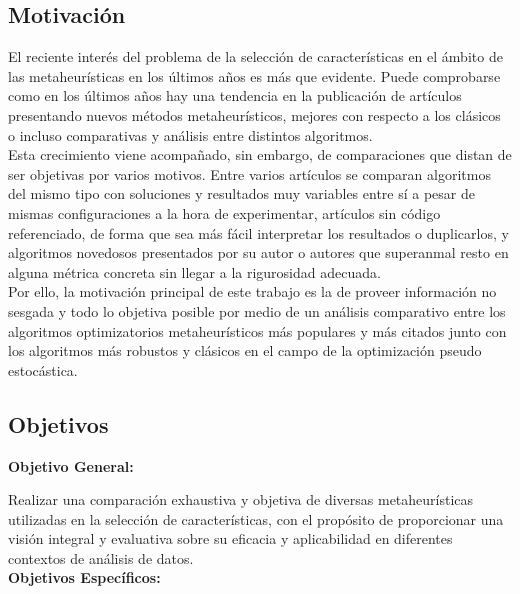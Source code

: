 \subsection{Motivación}
El reciente interés del problema de la selección de características en el ámbito de las
metaheurísticas en los últimos años es más que evidente. Puede comprobarse como en los
últimos años hay una tendencia en la publicación de artículos presentando nuevos métodos
metaheurísticos, mejores con respecto a los clásicos o incluso comparativas y análisis entre
distintos algoritmos.\\[6pt]

Esta crecimiento viene acompañado, sin embargo, de comparaciones que distan de ser objetivas
por varios motivos. Entre varios artículos se comparan algoritmos del mismo tipo con
soluciones y resultados muy variables entre sí a pesar de mismas configuraciones a la hora
de experimentar, artículos sin código referenciado, de forma que sea más fácil interpretar
los resultados o duplicarlos, y algoritmos novedosos presentados por su autor o autores que
superanmal resto en alguna métrica concreta sin llegar a la rigurosidad adecuada.\\[6pt]

Por ello, la motivación principal de este trabajo es la de proveer información no sesgada y
todo lo objetiva posible por medio de un análisis comparativo entre los
algoritmos optimizatorios metaheurísticos más populares y más citados junto con los
algoritmos más robustos y clásicos en el campo de la optimización pseudo estocástica.

\subsection{Objetivos}
\textbf{Objetivo General:}

Realizar una comparación exhaustiva y objetiva de diversas metaheurísticas utilizadas en la
selección de características, con el propósito de proporcionar una visión integral y
evaluativa sobre su eficacia y aplicabilidad en diferentes contextos de análisis de
datos.\\[6pt]
\textbf{Objetivos Específicos:}

